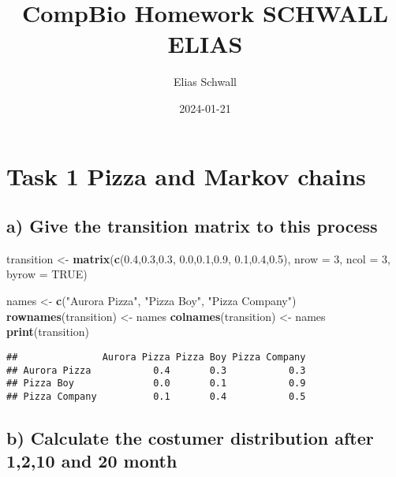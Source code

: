 \documentclass[
]{article}
\title{CompBio Homework SCHWALL ELIAS}
\author{Elias Schwall}
\date{2024-01-21}
\newenvironment{Shaded}{\begin{snugshade}}{\end{snugshade}}
\newcommand{\AttributeTok}[1]{\textcolor[rgb]{0.13,0.29,0.53}{#1}}
\newcommand{\ConstantTok}[1]{\textcolor[rgb]{0.56,0.35,0.01}{#1}}
\newcommand{\DecValTok}[1]{\textcolor[rgb]{0.00,0.00,0.81}{#1}}
\newcommand{\FloatTok}[1]{\textcolor[rgb]{0.00,0.00,0.81}{#1}}
\newcommand{\FunctionTok}[1]{\textcolor[rgb]{0.13,0.29,0.53}{\textbf{#1}}}
\newcommand{\NormalTok}[1]{#1}
\newcommand{\OtherTok}[1]{\textcolor[rgb]{0.56,0.35,0.01}{#1}}
\newcommand{\StringTok}[1]{\textcolor[rgb]{0.31,0.60,0.02}{#1}}
\begin{document}
\maketitle

\hypertarget{task-1-pizza-and-markov-chains}{%
\section{Task 1 Pizza and Markov
chains}\label{task-1-pizza-and-markov-chains}}

\hypertarget{a-give-the-transition-matrix-to-this-process}{%
\subsection{a) Give the transition matrix to this
process}\label{a-give-the-transition-matrix-to-this-process}}

\begin{Shaded}
\begin{Highlighting}[]
\NormalTok{transition }\OtherTok{\textless{}{-}} \FunctionTok{matrix}\NormalTok{(}\FunctionTok{c}\NormalTok{(}\FloatTok{0.4}\NormalTok{,}\FloatTok{0.3}\NormalTok{,}\FloatTok{0.3}\NormalTok{,}
                       \FloatTok{0.0}\NormalTok{,}\FloatTok{0.1}\NormalTok{,}\FloatTok{0.9}\NormalTok{,}
                       \FloatTok{0.1}\NormalTok{,}\FloatTok{0.4}\NormalTok{,}\FloatTok{0.5}\NormalTok{), }\AttributeTok{nrow =} \DecValTok{3}\NormalTok{, }\AttributeTok{ncol =} \DecValTok{3}\NormalTok{, }\AttributeTok{byrow =} \ConstantTok{TRUE}\NormalTok{)}

\NormalTok{names }\OtherTok{\textless{}{-}} \FunctionTok{c}\NormalTok{(}\StringTok{"Aurora Pizza"}\NormalTok{, }\StringTok{"Pizza Boy"}\NormalTok{, }\StringTok{"Pizza Company"}\NormalTok{)}
\FunctionTok{rownames}\NormalTok{(transition) }\OtherTok{\textless{}{-}}\NormalTok{ names}
\FunctionTok{colnames}\NormalTok{(transition) }\OtherTok{\textless{}{-}}\NormalTok{ names}
\FunctionTok{print}\NormalTok{(transition)}
\end{Highlighting}
\end{Shaded}

\begin{verbatim}
##               Aurora Pizza Pizza Boy Pizza Company
## Aurora Pizza           0.4       0.3           0.3
## Pizza Boy              0.0       0.1           0.9
## Pizza Company          0.1       0.4           0.5
\end{verbatim}

\hypertarget{b-calculate-the-costumer-distribution-after-1210-and-20-month}{%
\subsection{b) Calculate the costumer distribution after 1,2,10 and 20
month}\label{b-calculate-the-costumer-distribution-after-1210-and-20-month}}
\end{document}
